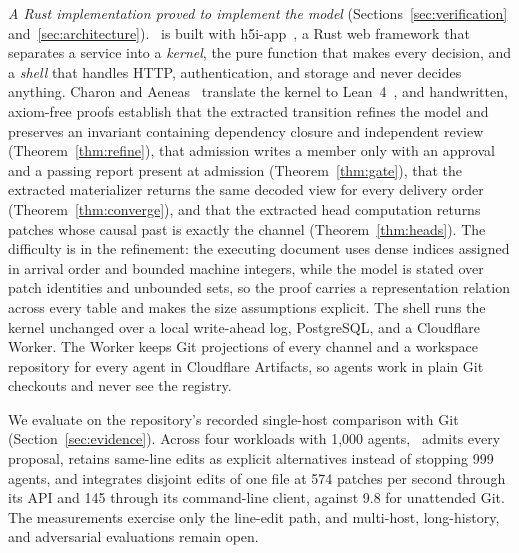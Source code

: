 \emph{A Rust implementation proved to implement the model} (Sections~\ref{sec:verification} and~\ref{sec:architecture}). \sys\ is built with h5i-app~\cite{h5i}, a Rust web framework that separates a service into a \emph{kernel}, the pure function that makes every decision, and a \emph{shell} that handles HTTP, authentication, and storage and never decides anything. Charon and Aeneas~\cite{charon,aeneas} translate the kernel to Lean~4~\cite{lean}, and handwritten, axiom-free proofs establish that the extracted transition refines the model and preserves an invariant containing dependency closure and independent review (Theorem~\ref{thm:refine}), that admission writes a member only with an approval and a passing report present at admission (Theorem~\ref{thm:gate}), that the extracted materializer returns the same decoded view for every delivery order (Theorem~\ref{thm:converge}), and that the extracted head computation returns patches whose causal past is exactly the channel (Theorem~\ref{thm:heads}). The difficulty is in the refinement: the executing document uses dense indices assigned in arrival order and bounded machine integers, while the model is stated over patch identities and unbounded sets, so the proof carries a representation relation across every table and makes the size assumptions explicit. The shell runs the kernel unchanged over a local write-ahead log, PostgreSQL, and a Cloudflare Worker. The Worker keeps Git projections of every channel and a workspace repository for every agent in Cloudflare Artifacts, so agents work in plain Git checkouts and never see the registry.

We evaluate on the repository's recorded single-host comparison with Git (Section~\ref{sec:evidence}). Across four workloads with 1,000 agents, \sys\ admits every proposal, retains same-line edits as explicit alternatives instead of stopping 999 agents, and integrates disjoint edits of one file at 574 patches per second through its API and 145 through its command-line client, against 9.8 for unattended Git. The measurements exercise only the line-edit path, and multi-host, long-history, and adversarial evaluations remain open.


